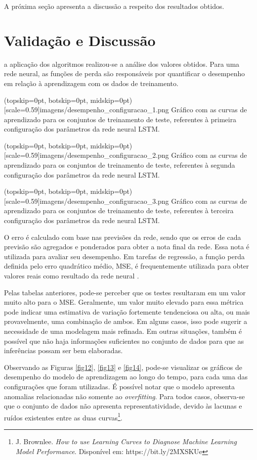 \documentclass{ieeeaccess}
\begin{document}
A próxima seção apresenta a discussão a respeito dos resultados obtidos.

\section{Validação e Discussão} 

\label{sec:introduction}  a aplicação dos algoritmos realizou-se a análise dos valores obtidos. Para uma rede neural, as funções de perda são responsáveis por quantificar o desempenho em relação à aprendizagem com os dados de treinamento. 

\Figure[h!](topskip=0pt, botskip=0pt, midskip=0pt)[scale=0.59]{imagens/{desempenho_configuracao_1.png}}
{Gráfico com as curvas de aprendizado para os conjuntos de treinamento de teste, referentes à primeira configuração dos parâmetros da rede neural LSTM. \label{fig12}}

\Figure[h!](topskip=0pt, botskip=0pt, midskip=0pt)[scale=0.59]{imagens/{desempenho_configuracao_2.png}}
{Gráfico com as curvas de aprendizado para os conjuntos de treinamento de teste, referentes à segunda configuração dos parâmetros da rede neural LSTM. \label{fig13}}

\Figure[h!](topskip=0pt, botskip=0pt, midskip=0pt)[scale=0.59]{imagens/{desempenho_configuracao_3.png}}
{Gráfico com as curvas de aprendizado para os conjuntos de treinamento de teste, referentes à terceira configuração dos parâmetros da rede neural LSTM. \label{fig14}}

O erro é calculado com base nas previsões da rede, sendo que os erros de cada previsão são agregados e ponderados para obter a nota final da rede. Essa nota é utilizada para avaliar seu desempenho. Em tarefas de regressão, a função perda definida pelo erro quadrático médio, MSE, é frequentemente utilizada para obter valores reais como resultado da rede neural \cite{b25}. 

Pelas tabelas anteriores, pode-se perceber que os testes resultaram em um valor muito alto para o MSE. Geralmente, um valor muito elevado para essa métrica pode indicar uma estimativa de variação fortemente tendenciosa ou alta, ou mais provavelmente, uma combinação de ambos. Em alguns casos, isso pode sugerir a necessidade de uma modelagem mais refinada. Em outras situações, também é possível que não haja informações suficientes no conjunto de dados para que as inferências possam ser bem elaboradas.

Observando as Figuras \ref{fig12}, \ref{fig13} e \ref{fig14}, pode-se visualizar os gráficos de desempenho do modelo de aprendizagem ao longo do tempo, para cada uma das configurações que foram utilizadas. É possível notar que o modelo apresenta anomalias relacionadas não somente ao \textit{overfitting}. Para todos casos, observa-se que o conjunto de dados não apresenta representatividade, devido às lacunas e ruídos existentes entre as duas curvas\footnote{J. Brownlee. \textit{How to use Learning Curves to Diagnose Machine Learning Model Performance}. Disponível em: https://bit.ly/2MXSKUe}.
\end{document}
